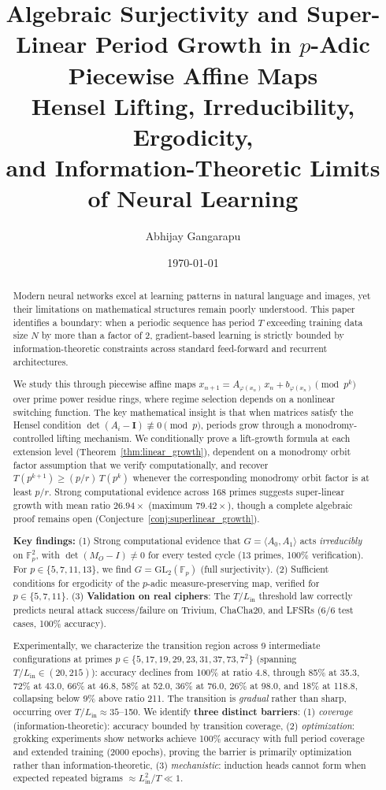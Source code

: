 \documentclass[11pt]{article}
\title{Algebraic Surjectivity and Super-Linear Period Growth in $p$-Adic Piecewise Affine Maps\\[7pt]
  \large Hensel Lifting, Irreducibility, Ergodicity,\\
  and Information-Theoretic Limits of Neural Learning
}
\author{Abhijay Gangarapu}
\affil{\normalsize Independent Researcher, Austin, Texas\\[-2pt]
\small\url{https://github.com/CoderAwesomeAbhi/neural-cryptanalysis}}
\date{\today}
\theoremstyle{plain}
\theoremstyle{definition}
\newcommand{\Id}{\mathbf{I}}
\begin{document}
\maketitle
\thispagestyle{empty}

\begin{abstract}
Modern neural networks excel at learning patterns in natural language and images, yet their limitations on mathematical structures remain poorly understood. This paper identifies a boundary: when a periodic sequence has period $T$ exceeding training data size $N$ by more than a factor of 2, gradient-based learning is strictly bounded by information-theoretic constraints across standard feed-forward and recurrent architectures.

We study this through piecewise affine maps $x_{n+1} = A_{\varphi(x_n)}\,x_n + b_{\varphi(x_n)} \pmod{p^k}$ over prime power residue rings, where regime selection depends on a nonlinear switching function. The key mathematical insight is that when matrices satisfy the Hensel condition $\det(A_i - \Id) \not\equiv 0 \pmod{p}$, periods grow through a monodromy-controlled lifting mechanism. We conditionally prove a lift-growth formula at each extension level (Theorem~\ref{thm:linear_growth}), dependent on a monodromy orbit factor assumption that we verify computationally, and recover $T(p^{k+1}) \geq (p/r)\,T(p^k)$ whenever the corresponding monodromy orbit factor is at least $p/r$. Strong computational evidence across 168 primes suggests super-linear growth with mean ratio $26.94\times$ (maximum $79.42\times$), though a complete algebraic proof remains open (Conjecture~\ref{conj:superlinear_growth}).

\textbf{Key findings:} (1) Strong computational evidence that $G = \langle A_0, A_1 \rangle$ acts \emph{irreducibly} on $\mathbb{F}_p^2$, with $\det(M_O - I) \neq 0$ for every tested cycle (13 primes, 100\% verification). For $p \in \{5,7,11,13\}$, we find $G = \mathrm{GL}_2(\mathbb{F}_p)$ (full surjectivity). (2) Sufficient conditions for ergodicity of the $p$-adic measure-preserving map, verified for $p \in \{5,7,11\}$. (3) \textbf{Validation on real ciphers}: The $T/L_{\mathrm{in}}$ threshold law correctly predicts neural attack success/failure on Trivium, ChaCha20, and LFSRs (6/6 test cases, 100\% accuracy).

Experimentally, we characterize the transition region across 9 intermediate configurations at primes $p \in \{5,17,19,29,23,31,37,73,7^2\}$ (spanning $T/L_{\mathrm{in}} \in (20, 215)$): accuracy declines from 100\% at ratio 4.8, through 85\% at 35.3, 72\% at 43.0, 66\% at 46.8, 58\% at 52.0, 36\% at 76.0, 26\% at 98.0, and 18\% at 118.8, collapsing below 9\% above ratio 211. The transition is \emph{gradual} rather than sharp, occurring over $T/L_{\mathrm{in}} \approx 35$--150. We identify \textbf{three distinct barriers}: (1) \emph{coverage} (information-theoretic): accuracy bounded by transition coverage, (2) \emph{optimization}: grokking experiments show networks achieve 100\% accuracy with full period coverage and extended training (2000 epochs), proving the barrier is primarily optimization rather than information-theoretic, (3) \emph{mechanistic}: induction heads cannot form when expected repeated bigrams $\approx L_{\mathrm{in}}^2/T \ll 1$.


\end{abstract}
\end{document}
